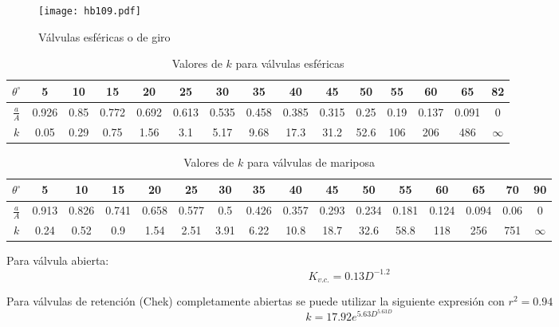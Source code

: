\begin{figure}[h!]
\centering
  \texttt{[image: hb109.pdf]}
  \caption{Válvulas esféricas o de giro}
  \label{hb109}
\end{figure}
\begin{table}[h!]
    \centering
    \begin{tabular}{@{}ccccccccccccccc@{}}
    \toprule
    $\theta^{\circ}$ & 5     & 10   & 15    & 20    & 25    & 30    & 35    & 40    & 45    & 50   & 55   & 60    & 65    & 82       \\ \midrule
    $\frac{a}{A}$    & 0.926 & 0.85 & 0.772 & 0.692 & 0.613 & 0.535 & 0.458 & 0.385 & 0.315 & 0.25 & 0.19 & 0.137 & 0.091 & 0        \\
    $k$              & 0.05  & 0.29 & 0.75  & 1.56  & 3.1   & 5.17  & 9.68  & 17.3  & 31.2  & 52.6 & 106  & 206   & 486   & $\infty$ \\ \bottomrule
    \end{tabular}
    \caption{Valores de $k$ para válvulas esféricas}
    \label{tabhb22}
    \end{table}
    \begin{table}[h!]
        \centering
        \begin{tabular}{@{}cccccccccccccccc@{}}
        \toprule
        $\theta^{\circ}$ & 5     & 10    & 15    & 20    & 25    & 30   & 35    & 40    & 45    & 50    & 55    & 60    & 65    & 70   & 90        \\ \midrule
        $\frac{a}{A}$    & 0.913 & 0.826 & 0.741 & 0.658 & 0.577 & 0.5  & 0.426 & 0.357 & 0.293 & 0.234 & 0.181 & 0.124 & 0.094 & 0.06 & 0         \\
        $k$              & 0.24  & 0.52  & 0.9   & 1.54  & 2.51  & 3.91 & 6.22  & 10.8  & 18.7  & 32.6  & 58.8  & 118   & 256   & 751  & $\infty$ \\ \bottomrule
        \end{tabular}
        \caption{Valores de $k$ para válvulas de mariposa}
        \label{tabhb23}
        \end{table}
Para válvula abierta:
\begin{equation}
    K_{v.c.} = 0.13D^{ - 1.2}
\end{equation}

Para válvulas de retención (Chek) completamente abiertas se puede utilizar la siguiente expresión con $r^2=0.94$
\begin{equation}
    k = 17.92e^{5.63D^{5.63D}}
\end{equation}

